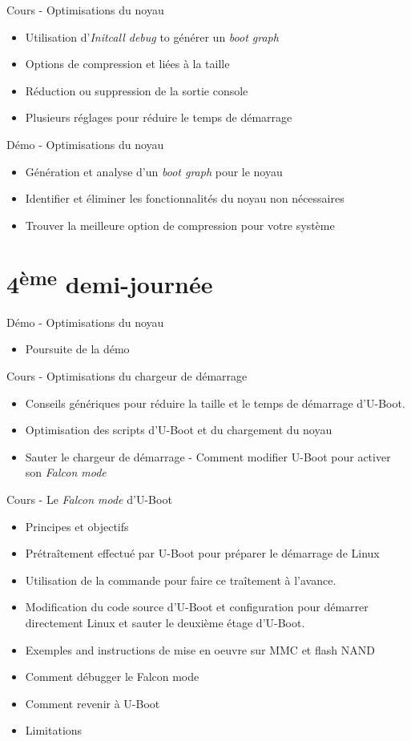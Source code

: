 \documentclass[a4paper,12pt,obeyspaces,spaces,hyphens]{article}
\begin{document}
\feagendatwocolumn
{Cours - Optimisations du noyau}
{
  \begin{itemize}
  \item Utilisation d'{\em Initcall debug} to générer un {\em boot graph}
  \item Options de compression et liées à la taille
  \item Réduction ou suppression de la sortie console
  \item Plusieurs réglages pour réduire le temps de démarrage
  \end{itemize}
}
{Démo - Optimisations du noyau}
{
 \begin{itemize}
 \item Génération et analyse d'un {\em boot graph} pour le noyau
 \item Identifier et éliminer les fonctionnalités du noyau non nécessaires
 \item Trouver la meilleure option de compression pour votre système
 \end{itemize}
}

\section{4\textsuperscript{ème} demi-journée}

\feagendaonecolumn
{Démo - Optimisations du noyau}
{
 \begin{itemize}
 \item Poursuite de la démo
 \end{itemize}
}

\feagendatwocolumn
{Cours - Optimisations du chargeur de démarrage}
{
  \begin{itemize}
  \item Conseils génériques pour réduire la taille et le temps
        de démarrage d'U-Boot.
  \item Optimisation des scripts d'U-Boot et du chargement du noyau
  \item Sauter le chargeur de démarrage - Comment modifier U-Boot pour
        activer son {\em Falcon mode}
  \end{itemize}
}
{Cours - Le {\em Falcon mode} d'U-Boot}
{
  \begin{itemize}
  \item Principes et objectifs
  \item Prétraîtement effectué par U-Boot pour préparer le démarrage de Linux
  \item Utilisation de la commande  pour faire ce traîtement à l'avance.
  \item Modification du code source d'U-Boot et configuration pour démarrer directement
        Linux et sauter le deuxième étage d'U-Boot.
  \item Exemples and instructions de mise en oeuvre sur MMC et flash NAND
  \item Comment débugger le Falcon mode
  \item Comment revenir à U-Boot
  \item Limitations
  \end{itemize}
}
\end{document}
